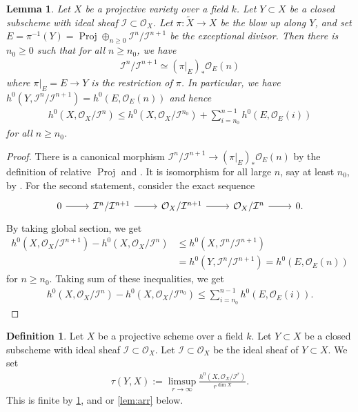 \documentclass[12pt]{amsart}
\theoremstyle{plain}
\newtheorem{lemma}[theorem]{Lemma}
\theoremstyle{definition}
\newtheorem{definition}[theorem]{Definition}
\numberwithin{equation}{section}
\def\O{{ \mathcal{O}}}
\def\I{{ \mathcal{I}}}
\DeclareMathOperator{\Proj}{Proj}
\begin{document}
\begin{lemma}\label{lem:relatetobup}
Let $X$ be a projective variety over a field $k$.
Let $Y \subset X$ be a closed subscheme with ideal sheaf $ \I \subset \O_{X}$.
Let $ \pi \colon \widetilde{X} \longrightarrow X$ be the blow up along $Y$, 
and set $E = \pi^{-1}(Y) = \Proj \oplus_{n\geq 0} \I^{n}/\I^{n+1}$ be the exceptional divisor.
Then there is $n_{0} \geq 0$ such that for all $n \geq n_{0}$, we have
\begin{align}
\I^{n}/\I^{n+1} \simeq (\pi|_{E})_{*}\O_{E}(n)
\end{align}
where $\pi|_{E}= E \longrightarrow Y$ is the restriction of $\pi$.
In particular, we have $h^{0}(Y, \I^{n}/\I^{n+1} ) = h^{0}(E,\O_{E}(n))$ and hence 
\begin{align}
h^{0}(X, \O_{X}/\I^{n})  \leq h^{0}(X, \O_{X}/\I^{n_{0}}) + \sum_{i=n_{0}}^{n-1} h^{0}(E, \O_{E}(i))
\end{align}
for all $n \geq n_{0}$.
\end{lemma}
\begin{proof}
There is a canonical morphism 
$\I^{n}/\I^{n+1} \longrightarrow (\pi|_{E})_{*}\O_{E}(n)$
by the definition of relative $\Proj$ and \cite[II Exercise 5.9 (a)]{HartshorneAG}.
It is isomorphism for all large $n$, say at least $n_{0}$, by \cite[II Exercise 5.9 (b)]{HartshorneAG}.
For the second statement, consider the exact sequence 
\begin{equation}
\begin{tikzcd}
0 \arrow[r] & \I^{n}/\I^{n+1} \arrow[r] & \O_{X}/\I^{n+1} \arrow[r] & \O_{X}/\I^{n} \arrow[r] & 0.
\end{tikzcd}
\end{equation}
By taking global section, we get
\begin{align}
h^{0}(X, \O_{X}/\I^{n+1}  ) - h^{0}(X, \O_{X}/\I^{n}  ) &\leq h^{0}(X, \I^{n}/\I^{n+1} )\\
& = h^{0}(Y, \I^{n}/\I^{n+1}) = h^{0}(E, \O_{E}(n))  
\end{align}
for $n \geq n_{0}$.
Taking sum of these inequalities, we get
\begin{align}
h^{0}(X, \O_{X}/\I^{n}) - h^{0}(X, \O_{X}/\I^{n_{0}}) \leq \sum_{i=n_{0}}^{n-1} h^{0}(E, \O_{E}(i)).
\end{align}
\end{proof}

\begin{definition}
Let $X$ be a projective scheme over a field $k$.
Let $Y \subset X$ be a closed subscheme with ideal sheaf $ \I \subset \O_{X}$.
Let $\I \subset \O_{X}$ be the ideal sheaf of $Y \subset X$.
We set
\begin{align}
\tau(Y, X) := \limsup_{r \to \infty} \frac{h^{0}(X, \O_{X} / \I^{r})}{r^{\dim X}}.
\end{align}
This is finite by \cref{lem:relatetobup}, and \cite[Example 1.2.33]{Lazpos1} or \cref{lem:arr} below.
\end{definition}
\end{document}
